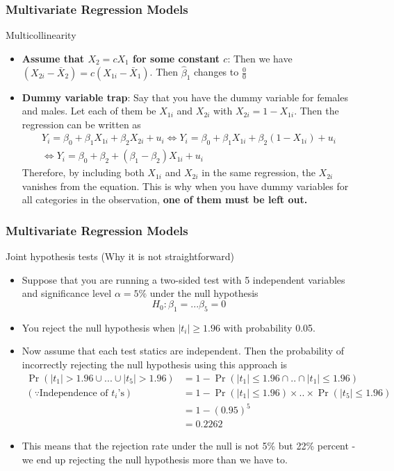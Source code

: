 \documentclass[compress]{beamer}
\begin{document}
\begin{frame}
\frametitle{Multivariate Regression Models}
Multicollinearity
\begin{itemize}
\item \textbf{Assume that $X_2 = cX_1$ for some constant $c$}: Then we have $(X_{2i}-\bar{X}_2)=c(X_{1i}-\bar{X}_1)$. Then $\hat{\beta}_1$ changes to $\frac{0}{0} $ 
\item \textbf{Dummy variable trap}: Say that you have the dummy variable for females and males. Let each of them be $X_{1i}$ and $X_{2i}$ with $X_{2i}=1-X_{1i}$. Then the regression can be written as
\begin{gather*}
Y_i = \beta_0 + \beta_1X_{1i} + \beta_2X_{2i} + u_i \iff Y_i = \beta_0 + \beta_1X_{1i} + \beta_2(1-X_{1i}) + u_i \\
\iff Y_i = \beta_0 + \beta_2 +(\beta_1-\beta_2)X_{1i}+u_i
\end{gather*}
Therefore, by including both $X_{1i}$ and $X_{2i}$ in the same regression, the $X_{2i}$ vanishes from the equation. This is why when you have dummy variables for all categories in the observation, \textbf{one of them must be left out.}
\end{itemize}
\end{frame}


\begin{frame}
\frametitle{Multivariate Regression Models}
Joint hypothesis tests (Why it is not straightforward)
\begin{itemize}
\item Suppose that you are running a two-sided test with 5 independent variables and significance level $\alpha = 5\%$ under the null hypothesis
\[
H_0: \beta_1=...\beta_5=0
\]
\item You reject the null hypothesis when $|t_i|\geq 1.96 $ with probability 0.05. 
\item Now assume that each test statics are independent. Then the probability of incorrectly rejecting the null hypothesis using this approach is
\footnotesize{\[
\begin{aligned}
\Pr(|t_1|>1.96 \cup...\cup |t_5|>1.96) & =1-\Pr(|t_1|\leq1.96\cap .. \cap|t_1|\leq1.96)\\
(\because\text{Independence of $t_i$'s}) \ \ &=1-\Pr(|t_1|\leq1.96)\times ..\times\Pr(|t_5|\leq1.96) \\
 & = 1-(0.95)^5 \\
 &= 0.2262
\end{aligned}
\]}\normalsize
\item This means that the rejection rate under the null is not 5\% but 22\% percent - we end up rejecting the null hypothesis more than we have to.
\end{itemize}
\end{frame}
\end{document}
